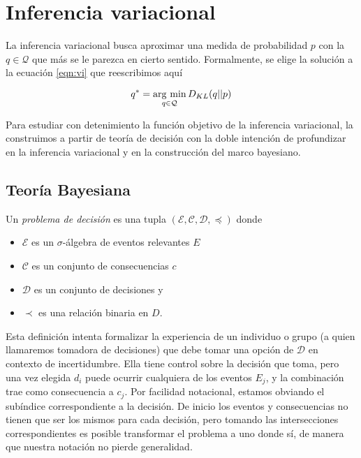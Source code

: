 \documentclass[main.tex]{subfiles}
\begin{document}
\chapter{Inferencia variacional}
La inferencia variacional busca aproximar una medida de probabilidad $p$ con la $q\in\mathcal{Q}$ que más se le parezca en cierto sentido. Formalmente, se elige la solución a la ecuación \eqref{eqn:vi} que reescribimos aquí

\begin{equation*}
	q^* = \operatorname*{arg\,\min}_{q \in \mathcal{Q}} D_{KL}(q||p)
\end{equation*}

Para estudiar con detenimiento la función objetivo de la inferencia variacional, la construimos a partir de teoría de decisión con la doble intención de profundizar en la inferencia variacional y en la construcción del marco bayesiano. 

\section{Teoría Bayesiana}
\begin{definition}
	Un \textit{problema de decisión} es una tupla $(\mathcal{E}, \mathcal{C}, \mathcal{D}, \preceq)$ donde
	\begin{itemize}
		\item $\mathcal{E}$ es un $\sigma$-álgebra de eventos relevantes $E$
		\item $\mathcal{C}$ es un conjunto de consecuencias $c$
		\item $\mathcal{D}$ es un conjunto de decisiones y 
		\item $\prec$ es una relación binaria en $D$.
	\end{itemize}
\end{definition}
	
Esta definición intenta formalizar la experiencia de un individuo o grupo (a quien llamaremos tomadora de decisiones) que debe tomar una opción de $\mathcal{D}$ en contexto de incertidumbre. Ella tiene control sobre la decisión que toma, pero una vez elegida $d_i$ puede ocurrir cualquiera de los eventos $E_j$, y la combinación trae como consecuencia a $c_j$. Por facilidad notacional, estamos obviando el subíndice correspondiente a la decisión. De inicio los eventos y consecuencias no tienen que ser los mismos para cada decisión, pero tomando las intersecciones correspondientes es posible transformar el problema a uno donde sí, de manera que nuestra notación no pierde generalidad.
\end{document}
